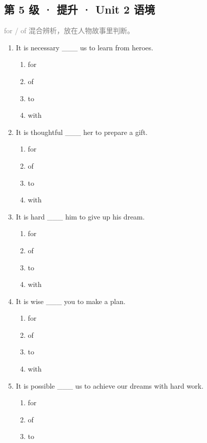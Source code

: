 \documentclass[11pt,a4paper]{ctexart}
\begin{document}
\subsection*{第 5 级 · 提升 · Unit 2 语境}
\noindent\textcolor{gray}{for / of 混合辨析，放在人物故事里判断。}\par\smallskip
\begin{enumerate}[leftmargin=*,itemsep=4pt]
\item It is necessary \_\_\_ us to learn from heroes.
\begin{enumerate}[label=\Alph*.,leftmargin=2em,itemsep=1pt,topsep=2pt]
\item for
\item of
\item to
\item with
\end{enumerate}
\item It is thoughtful \_\_\_ her to prepare a gift.
\begin{enumerate}[label=\Alph*.,leftmargin=2em,itemsep=1pt,topsep=2pt]
\item for
\item of
\item to
\item with
\end{enumerate}
\item It is hard \_\_\_ him to give up his dream.
\begin{enumerate}[label=\Alph*.,leftmargin=2em,itemsep=1pt,topsep=2pt]
\item for
\item of
\item to
\item with
\end{enumerate}
\item It is wise \_\_\_ you to make a plan.
\begin{enumerate}[label=\Alph*.,leftmargin=2em,itemsep=1pt,topsep=2pt]
\item for
\item of
\item to
\item with
\end{enumerate}
\item It is possible \_\_\_ us to achieve our dreams with hard work.
\begin{enumerate}[label=\Alph*.,leftmargin=2em,itemsep=1pt,topsep=2pt]
\item for
\item of
\item to

\end{enumerate}
\end{enumerate}
\end{document}
